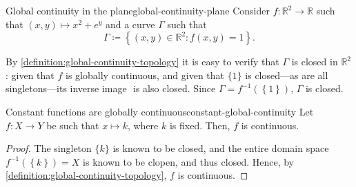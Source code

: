 \documentclass{article}
\numberwithin{equation}{section}
\numberwithin{figure}{section}
\begin{document}
\begin{example}{Global continuity in the plane}{global-continuity-plane}
    Consider $ f \colon \mathbb{R}^2 \to \mathbb{R} $ such that $ (x, y) \mapsto
    x^2 + e^y $ and a curve $ \Gamma $ such that
    \begin{equation}
        \Gamma \coloneq \left\{ (x, y) \in \mathbb{R}^2 \colon f(x, y) = 1
        \right\}.
    \end{equation}

    \begingroup
        \tikzset{external/export=true}
        \centering
        \hspace*{-2em}\qquad
    \endgroup

    By \cref{definition:global-continuity-topology} it is easy to verify that $
    \Gamma $ is closed in $ \mathbb{R}^2 $: given that $ f $ is globally
    continuous, and given that $ \{ 1 \} $ is closed---as are all
    singletons---its inverse image $  $ is
    also closed. Since $ \Gamma = f^{-1}\left(\left\{1\right\}\right) $, $
    \Gamma $ is closed.
\end{example}
\begin{theorem}{Constant functions are globally
        continuous}{constant-global-continuity}
    Let $ f \colon X \to Y $ be such that $ x \mapsto k $, where $ k $ is fixed.
    Then, $ f $ is continuous.
    \begin{proof}
        The singleton $ \{ k \} $ is known to be closed, and the entire domain
        space $ f^{-1}\left(\left\{ k \right\}\right) = X $ is known to be
        clopen, and thus closed. Hence, by
        \cref{definition:global-continuity-topology}, $ f $ is continuous.
    \end{proof}
\end{theorem}
\end{document}
